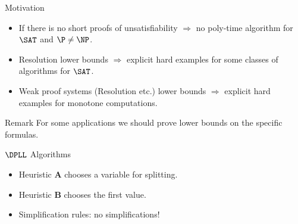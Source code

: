 \begin{frame}{Motivation}

    \begin{itemize}
        \item If there is no short proofs of unsatisfiability $\Rightarrow$ no poly-time algorithm for
            $\SAT$ and $\P \neq \NP$.
        \pause
        \item Resolution lower bounds $\Rightarrow$ explicit hard examples for some classes of algorithms
            for $\SAT$.
        \pause
        \item Weak proof systems (Resolution etc.) lower bounds $\Rightarrow$ explicit hard examples for
            \alert{monotone} computations.
    \end{itemize}

    \pause
    \vspace{1cm}
    \begin{block}{Remark}
        For some applications we should prove lower bounds on the specific formulas.        
    \end{block}
\end{frame}


\begin{frame}{$\DPLL$ Algorithms}

    \begin{center}
                
    \end{center}

    
	\pause
    \pause
    \pause
    \pause
    \pause
    \begin{itemize}
        \item Heuristic $\mathbf{A}$ chooses a variable for splitting.
    	\pause
	    \item Heuristic $\mathbf{B}$ chooses the first value.
    	\pause
    	\item Simplification rules: \alert{no simplifications!}
    \end{itemize}
\end{frame}

